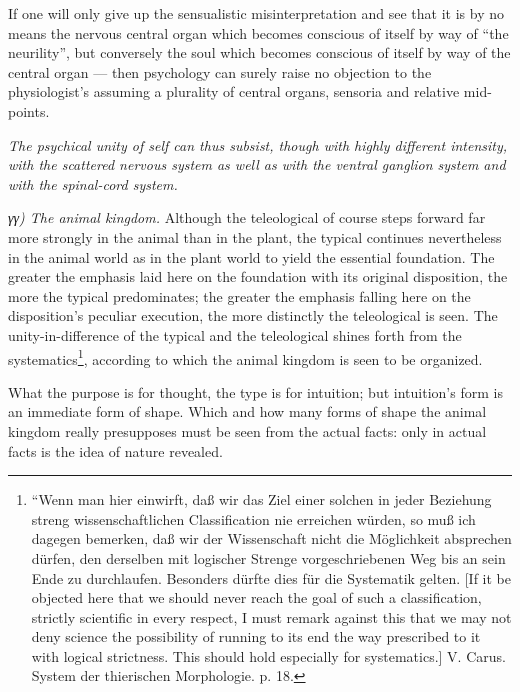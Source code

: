 \documentclass[12pt,a4paper]{book}
\begin{document}
\setcounter{footnote}{0}
If one will only give up the sensualistic misinterpretation and see that it is by no
means the nervous central organ which becomes conscious of itself by way of ``the
neurility'', but conversely the soul which becomes conscious of itself by way of the
central organ --- then psychology can surely raise no objection to the physiologist's
assuming a plurality of central organs, sensoria and relative mid-points.

\emph{The psychical unity of self can thus subsist, though with highly different
intensity, with the scattered nervous system as well as with the ventral ganglion
system and with the spinal-cord system.}

\emph{γγ) The animal kingdom.} Although the teleological of course steps forward far
more strongly in the animal than in the plant, the typical continues nevertheless in
the animal world as in the plant world to yield the essential foundation. The greater
the emphasis laid here on the foundation with its original disposition, the more the
typical predominates; the greater the emphasis falling here on the disposition's
peculiar execution, the more distinctly the teleological is seen. The
unity-in-difference of the typical and the teleological shines forth from the
systematics\footnote{``Wenn man hier einwirft, daß wir das Ziel einer solchen in jeder
Beziehung streng wissenschaftlichen Classification nie erreichen würden, so muß ich
dagegen bemerken, daß wir der Wissenschaft nicht die Möglichkeit absprechen dürfen,
den derselben mit logischer Strenge vorgeschriebenen Weg bis an sein Ende zu
durchlaufen. Besonders dürfte dies für die Systematik gelten. [If it be objected here
that we should never reach the goal of such a classification, strictly scientific in
every respect, I must remark against this that we may not deny science the possibility
of running to its end the way prescribed to it with logical strictness. This should
hold especially for systematics.] V. Carus. System der thierischen Morphologie.
p. 18.}, according to which the animal kingdom is seen to be organized.

What the purpose is for thought, the type is for intuition; but intuition's form is an
immediate form of shape. Which and how many forms of shape the animal kingdom really
presupposes must be seen from the actual facts: only in actual facts is the idea of
nature revealed.
\end{document}

